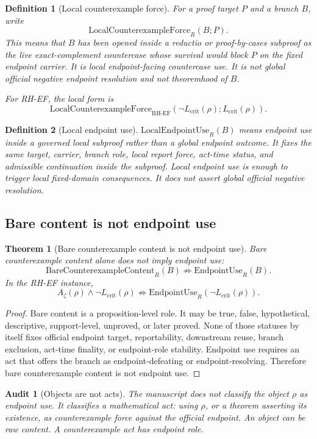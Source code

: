 \documentclass[11pt]{article}
\newtheorem{definition}{Definition}[section]
\newtheorem{theorem}{Theorem}[section]
\newtheorem{audit}{Audit}[section]
\newcommand{\Az}{A_{\zeta}}
\newcommand{\Lcrit}{L_{\mathrm{crit}}}
\newcommand{\RH}{\mathrm{RH}}
\newcommand{\EF}{\mathrm{EF}}
\newcommand{\EndpointUse}{\mathrm{EndpointUse}}
\newcommand{\BareCx}{\mathrm{BareCounterexampleContent}}
\newcommand{\LocalCxForce}{\mathrm{LocalCounterexampleForce}}
\newcommand{\LocalEndpointUse}{\mathrm{LocalEndpointUse}}
\begin{document}
\begin{definition}[Local counterexample force]
For a proof target \(P\) and a branch \(B\), write
\[
\LocalCxForce_R(B;P).
\]
This means that \(B\) has been opened inside a reductio or proof-by-cases subproof as the live exact-complement countercase whose survival would block \(P\) on the fixed endpoint carrier. It is local endpoint-facing countercase use. It is not global official negative endpoint resolution and not theoremhood of \(B\).

For RH-EF, the local form is
\[
\LocalCxForce_{\RH\text{-}\EF}(\neg\Lcrit(\rho);\Lcrit(\rho)).
\]
\end{definition}

\begin{definition}[Local endpoint use]
\(\LocalEndpointUse_R(B)\) means endpoint use inside a governed local subproof rather than a global endpoint outcome. It fixes the same target, carrier, branch role, local report force, act-time status, and admissible continuation inside the subproof. Local endpoint use is enough to trigger local fixed-domain consequences. It does not assert global official negative resolution.
\end{definition}

\subsection{Bare content is not endpoint use}

\begin{theorem}[Bare counterexample content is not endpoint use]
Bare counterexample content alone does not imply endpoint use:
\[
\BareCx_R(B)\not\Rightarrow \EndpointUse_R(B).
\]
In the RH-EF instance,
\[
\Az(\rho)\wedge\neg\Lcrit(\rho)\not\Rightarrow
\EndpointUse_R(\neg\Lcrit(\rho)).
\]
\end{theorem}

\begin{proof}
Bare content is a proposition-level role. It may be true, false, hypothetical, descriptive, support-level, unproved, or later proved. None of those statuses by itself fixes official endpoint target, reportability, downstream reuse, branch exclusion, act-time finality, or endpoint-role stability. Endpoint use requires an act that offers the branch as endpoint-defeating or endpoint-resolving. Therefore bare counterexample content is not endpoint use.
\end{proof}

\begin{audit}[Objects are not acts]
The manuscript does not classify the object \(\rho\) as endpoint use. It classifies a mathematical act: using \(\rho\), or a theorem asserting its existence, as counterexample force against the official endpoint. An object can be raw content. A counterexample act has endpoint role.
\end{audit}
\end{document}
